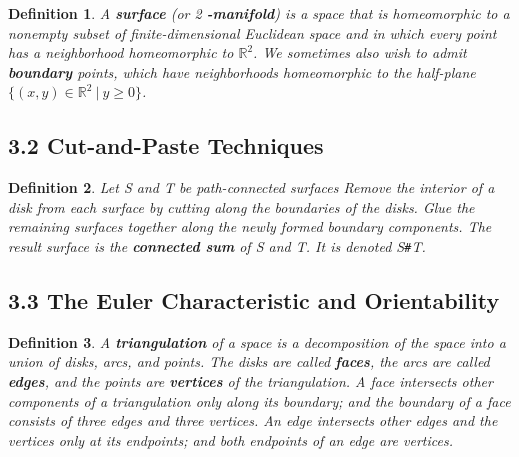 \documentclass[executivepaper]{article}
\newtheorem{definition}{Definition}
\begin{document}
\begin{tcolorbox}

\begin{definition}

\textit{A \textbf{surface} (or 2 \textbf{-manifold}) is a space that is homeomorphic to a nonempty subset of finite-dimensional Euclidean space and in which every point has a neighborhood homeomorphic to $\mathbb{R}^{2}$. We sometimes also wish to admit \textbf{boundary} points, which have neighborhoods homeomorphic to the half-plane $\{(x,y) \in \mathbb{R}^{2} ~ | ~ y \geq 0\}$}.

\end{definition}

\end{tcolorbox}

\subsection*{3.2 Cut-and-Paste Techniques}

\begin{tcolorbox}

\begin{definition}

\textit{Let S and T be path-connected surfaces Remove the interior of a disk from each surface by cutting along the boundaries of the disks. Glue the remaining surfaces together along the newly formed boundary components. The result surface is the \textbf{connected sum} of S and T. It is denoted S\texttt{\#}T.}

\end{definition}

\end{tcolorbox}

\subsection*{3.3 The Euler Characteristic and Orientability}

\begin{tcolorbox}

\begin{definition}

\textit{A \textbf{triangulation} of a space is a decomposition of the space into a union of disks, arcs, and points. The disks are called \textbf{faces}, the arcs are called \textbf{edges}, and the points are \textbf{vertices} of the triangulation. A face intersects other components of a triangulation only along its boundary; and the boundary of a face consists of three edges and three vertices. An edge intersects other edges and the vertices only at its endpoints; and both endpoints of an edge are vertices.}

\end{definition}

\end{tcolorbox}
\end{document}
